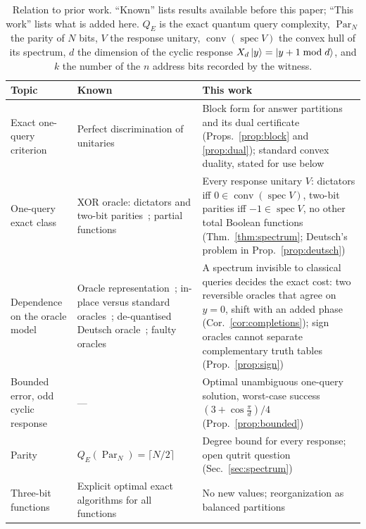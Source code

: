 \documentclass[
  aps,
  pra,
  reprint,
  nofootinbib
]{revtex4-2}
\begin{document}
\begin{table}[t]
\caption{Relation to prior work. ``Known'' lists results available before
this paper; ``This work'' lists what is added here. \(Q_E\) is the exact
quantum query complexity, \(\operatorname{Par}_N\) the parity of \(N\) bits,
\(V\) the response unitary, \(\operatorname{conv}(\operatorname{spec}V)\) the
convex hull of its spectrum, \(d\) the dimension of the cyclic response
\(X_d\ket y=\ket{y+1\bmod d}\), and \(k\) the number of the \(n\) address bits
recorded by the witness.}
\label{tab:prior}
\begin{ruledtabular}
\begin{tabular}{p{}p{}p{}}
Topic & Known & This work\\
\hline
Exact one-query criterion &
Perfect discrimination of unitaries~\cite{Acin2001UnitaryDiscrimination,DuanFengYing2009} &
Block form for answer partitions and its dual certificate
(Props.~\ref{prop:block} and \ref{prop:dual}); standard convex duality,
stated for use below\\
One-query exact class &
XOR oracle: dictators and two-bit parities~\cite{ChenYeLi2020};
partial functions~\cite{YeLi2020partial} &
Every response unitary \(V\): dictators iff
\(0\in\operatorname{conv}(\operatorname{spec}V)\), two-bit parities iff
\(-1\in\operatorname{spec}V\), no other total Boolean functions
(Thm.~\ref{thm:spectrum}; Deutsch's problem in
Prop.~\ref{prop:deutsch})\\
Dependence on the oracle model &
Oracle representation~\cite{WojcikChhajlany2006}; in-place versus standard
oracles~\cite{KashefiKentVedralBanaszek2002}; de-quantised Deutsch
oracle~\cite{Calude2006Dequantising}; faulty
oracles~\cite{RegevSchiff2008} &
A spectrum invisible to classical queries decides the exact cost: two
reversible oracles that agree on \(y=0\), shift with an added phase
(Cor.~\ref{cor:completions}); sign oracles cannot separate complementary truth
tables (Prop.~\ref{prop:sign})\\
Bounded error, odd cyclic response &
--- &
Optimal unambiguous one-query solution, worst-case success
\((3+\cos\frac{\pi}{d})/4\) (Prop.~\ref{prop:bounded})\\
Parity &
\(Q_E(\operatorname{Par}_N)=\lceil N/2\rceil\)~\cite{bbcmw-01,Farhi-98} &
Degree bound for every response; open qutrit question
(Sec.~\ref{sec:spectrum})\\
Three-bit functions &
Explicit optimal exact algorithms for all
functions~\cite{MontanaroJozsaMitchison2015} &
No new values; reorganization as balanced partitions

\end{tabular}
\end{ruledtabular}
\end{table}
\end{document}
